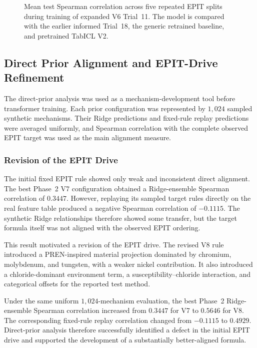 \documentclass{article}
\begin{document}
\begin{figure}[htbp]
    \centering
    
    \caption{Mean test Spearman correlation across five repeated EPIT splits during training of expanded V6 Trial~11. The model is compared with the earlier informed Trial~18, the generic retrained baseline, and pretrained TabICL V2.}
    \label{fig:expanded-v6-spearman}
\end{figure}

\subsection{Direct Prior Alignment and EPIT-Drive Refinement}
\label{sec:results-direct-prior}

The direct-prior analysis was used as a mechanism-development tool before transformer training. Each prior configuration was represented by \(1{,}024\) sampled synthetic mechanisms. Their Ridge predictions and fixed-rule replay predictions were averaged uniformly, and Spearman correlation with the complete observed EPIT target was used as the main alignment measure.

\subsubsection{Revision of the EPIT Drive}

The initial fixed EPIT rule showed only weak and inconsistent direct alignment. The best Phase~2 V7 configuration obtained a Ridge-ensemble Spearman correlation of \(0.3447\). However, replaying its sampled target rules directly on the real feature table produced a negative Spearman correlation of \(-0.1115\). The synthetic Ridge relationships therefore showed some transfer, but the target formula itself was not aligned with the observed EPIT ordering.

This result motivated a revision of the EPIT drive. The revised V8 rule introduced a PREN-inspired material projection dominated by chromium, molybdenum, and tungsten, with a weaker nickel contribution. It also introduced a chloride-dominant environment term, a susceptibility--chloride interaction, and categorical offsets for the reported test method.

Under the same uniform \(1{,}024\)-mechanism evaluation, the best Phase~2 Ridge-ensemble Spearman correlation increased from \(0.3447\) for V7 to \(0.5646\) for V8. The corresponding fixed-rule replay correlation changed from \(-0.1115\) to \(0.4929\). Direct-prior analysis therefore successfully identified a defect in the initial EPIT drive and supported the development of a substantially better-aligned formula.
\end{document}
